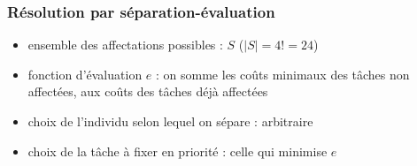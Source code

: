 \documentclass{beamer}
\begin{document}
\begin{frame}
  \frametitle{Résolution par séparation-évaluation}

  \begin{itemize}
    \item ensemble des affectations possibles : $S$ ($|S| = 4! = 24$) 
    \item fonction d'évaluation $e$ : on somme les coûts minimaux des tâches non affectées, aux coûts des tâches déjà affectées
    \item choix de l'individu selon lequel on sépare : arbitraire %
    \item choix de la tâche à fixer en priorité : celle qui minimise $e$ %
  \end{itemize}
\end{frame}
\end{document}

